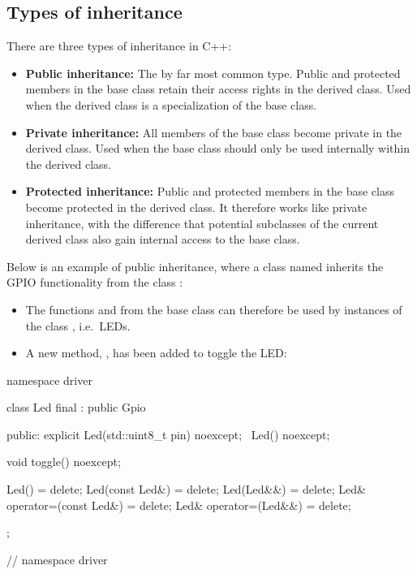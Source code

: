 \subsection{Types of inheritance}
\label{c3:sec:inheritancetypes}
There are three types of inheritance in C++:
\begin{itemize}
  \item \textbf{Public inheritance:} The by far most common type. Public and protected members in
    the base class retain their access rights in the derived class. Used when the derived class is
    a specialization of the base class.
  \item \textbf{Private inheritance:} All members of the base class become private in the derived
    class. Used when the base class should only be used internally within the derived class.
  \item \textbf{Protected inheritance:} Public and protected members in the base class become
    protected in the derived class. It therefore works like private inheritance, with the
    difference that potential subclasses of the current derived class also gain internal access to
    the base class.
\end{itemize}
Below is an example of public inheritance, where a class named  inherits the
GPIO functionality from the class :
\begin{itemize}
  \item The functions  and  from the base class  can
    therefore be used by instances of the class , i.e.\ LEDs.
  \item A new method, , has been added to toggle the LED:
\end{itemize}

\begin{cppcode}
namespace driver
{
class Led final : public Gpio
{
public:
    explicit Led(std::uint8_t pin) noexcept;
    ~Led() noexcept;

    void toggle() noexcept;

    Led()                      = delete;
    Led(const Led&)            = delete;
    Led(Led&&)                 = delete;
    Led& operator=(const Led&) = delete;
    Led& operator=(Led&&)      = delete;
};
} // namespace driver
\end{cppcode}


